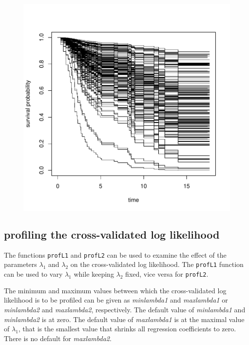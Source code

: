 \documentclass[a4paper]{article}
\newcommand{\Rfunction}[1]{{\texttt{#1}}}
\newcommand{\Rfunarg}[1]{{\textit{#1}}}
\begin{document}
\begin{figure}
\begin{Schunk}
\end{Schunk}
\includegraphics{penalized-breslowplot}
\end{figure}

\subsection{profiling the cross-validated log likelihood}

The functions \Rfunction{profL1} and \Rfunction{profL2} can be used to examine the effect of the parameters $\lambda_1$ and $\lambda_2$ on the cross-validated log likelihood. The \Rfunction{profL1} function can be used to vary $\lambda_1$ while keeping $\lambda_2$ fixed, vice versa for \Rfunction{profL2}.

The minimum and maximum values between which the cross-validated log likelihood is to be profiled can be given as \Rfunarg{minlambda1} and  \Rfunarg{maxlambda1} or \Rfunarg{minlambda2} and  \Rfunarg{maxlambda2}, respectively. The default value of \Rfunarg{minlambda1} and  \Rfunarg{minlambda2} is at zero.  The default value of \Rfunarg{maxlambda1} is at the maximal value of $\lambda_1$, that is the smallest value that shrinks all regression coefficients to zero. There is no default for \Rfunarg{maxlambda2}.
\end{document}
